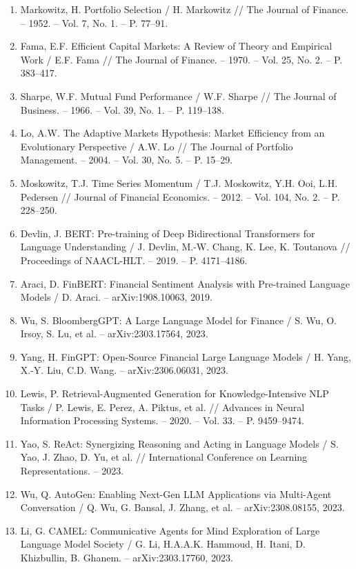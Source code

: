 \documentclass[14pt,a4paper]{extarticle}
\begin{document}
\begin{enumerate}[label=\arabic*., leftmargin=1.25cm]
  \item Markowitz, H. Portfolio Selection / H. Markowitz // The Journal of Finance. -- 1952. -- Vol. 7, No. 1. -- P. 77--91.
  \item Fama, E.F. Efficient Capital Markets: A Review of Theory and Empirical Work / E.F. Fama // The Journal of Finance. -- 1970. -- Vol. 25, No. 2. -- P. 383--417.
  \item Sharpe, W.F. Mutual Fund Performance / W.F. Sharpe // The Journal of Business. -- 1966. -- Vol. 39, No. 1. -- P. 119--138.
  \item Lo, A.W. The Adaptive Markets Hypothesis: Market Efficiency from an Evolutionary Perspective / A.W. Lo // The Journal of Portfolio Management. -- 2004. -- Vol. 30, No. 5. -- P. 15--29.
  \item Moskowitz, T.J. Time Series Momentum / T.J. Moskowitz, Y.H. Ooi, L.H. Pedersen // Journal of Financial Economics. -- 2012. -- Vol. 104, No. 2. -- P. 228--250.
  \item Devlin, J. BERT: Pre-training of Deep Bidirectional Transformers for Language Understanding / J. Devlin, M.-W. Chang, K. Lee, K. Toutanova // Proceedings of NAACL-HLT. -- 2019. -- P. 4171--4186.
  \item Araci, D. FinBERT: Financial Sentiment Analysis with Pre-trained Language Models / D. Araci. -- arXiv:1908.10063, 2019.
  \item Wu, S. BloombergGPT: A Large Language Model for Finance / S. Wu, O. Irsoy, S. Lu, et al. -- arXiv:2303.17564, 2023.
  \item Yang, H. FinGPT: Open-Source Financial Large Language Models / H. Yang, X.-Y. Liu, C.D. Wang. -- arXiv:2306.06031, 2023.
  \item Lewis, P. Retrieval-Augmented Generation for Knowledge-Intensive NLP Tasks / P. Lewis, E. Perez, A. Piktus, et al. // Advances in Neural Information Processing Systems. -- 2020. -- Vol. 33. -- P. 9459--9474.
  \item Yao, S. ReAct: Synergizing Reasoning and Acting in Language Models / S. Yao, J. Zhao, D. Yu, et al. // International Conference on Learning Representations. -- 2023.
  \item Wu, Q. AutoGen: Enabling Next-Gen LLM Applications via Multi-Agent Conversation / Q. Wu, G. Bansal, J. Zhang, et al. -- arXiv:2308.08155, 2023.
  \item Li, G. CAMEL: Communicative Agents for Mind Exploration of Large Language Model Society / G. Li, H.A.A.K. Hammoud, H. Itani, D. Khizbullin, B. Ghanem. -- arXiv:2303.17760, 2023.

\end{enumerate}
\end{document}
